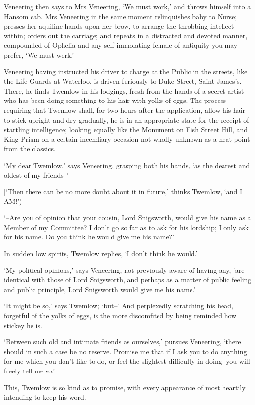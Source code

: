 Veneering then says to Mrs Veneering, ‘We must work,’ and throws himself
into a Hansom cab. Mrs Veneering in the same moment relinquishes baby
to Nurse; presses her aquiline hands upon her brow, to arrange the
throbbing intellect within; orders out the carriage; and repeats in
a distracted and devoted manner, compounded of Ophelia and any
self-immolating female of antiquity you may prefer, ‘We must work.’

Veneering having instructed his driver to charge at the Public in the
streets, like the Life-Guards at Waterloo, is driven furiously to Duke
Street, Saint James’s. There, he finds Twemlow in his lodgings, fresh
from the hands of a secret artist who has been doing something to his
hair with yolks of eggs. The process requiring that Twemlow shall, for
two hours after the application, allow his hair to stick upright and dry
gradually, he is in an appropriate state for the receipt of startling
intelligence; looking equally like the Monument on Fish Street Hill, and
King Priam on a certain incendiary occasion not wholly unknown as a neat
point from the classics.

‘My dear Twemlow,’ says Veneering, grasping both his hands, ‘as the
dearest and oldest of my friends--’

[‘Then there can be no more doubt about it in future,’ thinks Twemlow,
‘and I AM!’)

‘--Are you of opinion that your cousin, Lord Snigsworth, would give his
name as a Member of my Committee? I don’t go so far as to ask for his
lordship; I only ask for his name. Do you think he would give me his
name?’

In sudden low spirits, Twemlow replies, ‘I don’t think he would.’

‘My political opinions,’ says Veneering, not previously aware of having
any, ‘are identical with those of Lord Snigsworth, and perhaps as a
matter of public feeling and public principle, Lord Snigsworth would
give me his name.’

‘It might be so,’ says Twemlow; ‘but--’ And perplexedly scratching his
head, forgetful of the yolks of eggs, is the more discomfited by being
reminded how stickey he is.

‘Between such old and intimate friends as ourselves,’ pursues Veneering,
‘there should in such a case be no reserve. Promise me that if I ask you
to do anything for me which you don’t like to do, or feel the slightest
difficulty in doing, you will freely tell me so.’

This, Twemlow is so kind as to promise, with every appearance of most
heartily intending to keep his word.

